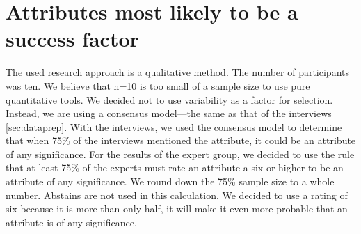 \section{Attributes most likely to be a success factor}
\label{sec:expertattributessf}
The used research approach is a qualitative method. The number of participants was ten. We believe that n=10 is too small of a sample size to use pure quantitative tools. We decided not to use variability as a factor for selection. Instead, we are using a consensus model—the same as that of the interviews \cref{sec:dataprep}. With the interviews, we used the consensus model to determine that when 75\% of the interviews mentioned the \gls{attribute}, it could be an \gls{attribute} of any significance. For the results of the expert group, we decided to use the rule that at least 75\% of the experts must rate an \gls{attribute} a six or higher to be an attribute of any significance. We round down the 75\% sample size to a whole number. Abstains are not used in this calculation. We decided to use a rating of six because it is more than only half, it will make it even more probable that an attribute is of any significance.

